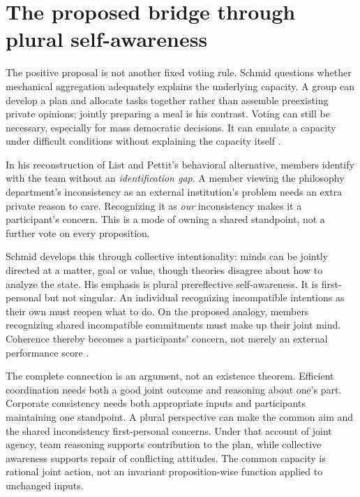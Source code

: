 \section{The proposed bridge through plural self-awareness}
\label{sec:p17-rat102-intentionality}

The positive proposal is not another fixed voting rule. Schmid questions
whether mechanical aggregation adequately explains the underlying capacity.
A group can develop a plan and allocate tasks together rather than assemble
preexisting private opinions; jointly preparing a meal is his contrast.
Voting can still be necessary, especially for mass democratic decisions.
It can emulate a capacity under difficult conditions without explaining
the capacity itself \parencite[p.~597]{Schmid2021CollectiveRationality}.

In his reconstruction of List and Pettit's behavioral alternative, members
identify with the team without an \emph{identification gap}. A member
viewing the philosophy department's inconsistency as an external
institution's problem needs an extra private reason to care. Recognizing
it as \emph{our} inconsistency makes it a participant's concern. This is
a mode of owning a shared standpoint, not a further vote on every proposition.

Schmid develops this through collective intentionality: minds can be jointly
directed at a matter, goal or value, though theories disagree about how to
analyze the state. His emphasis is plural prereflective self-awareness.
It is first-personal but not singular. An individual recognizing incompatible
intentions as their own must reopen what to do. On the proposed analogy,
members recognizing shared incompatible commitments must make up their
joint mind. Coherence thereby becomes a participants' concern, not merely
an external performance score
\parencite[pp.~597--598]{Schmid2021CollectiveRationality}.

The complete connection is an argument, not an existence theorem. Efficient
coordination needs both a good joint outcome and reasoning about one's
part. Corporate consistency needs both appropriate inputs and participants
maintaining one standpoint. A plural perspective can make the common aim
and the shared inconsistency first-personal concerns. Under that account
of joint agency, team reasoning supports contribution to the plan, while
collective awareness supports repair of conflicting attitudes. The common
capacity is rational joint action, not an invariant proposition-wise
function applied to unchanged inputs.

